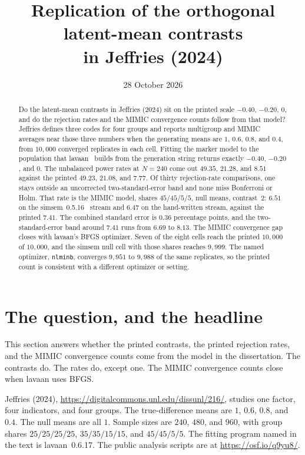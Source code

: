 \documentclass[11pt]{article}
\title{Replication of the orthogonal latent-mean contrasts\\
in Jeffries (2024)}
\author{}
\date{28 October 2026}
\begin{document}
\maketitle

\begin{abstract}
Do the latent-mean contrasts in Jeffries (2024) sit on the printed scale
\(-0.40\), \(-0.20\), \(0\), and do the rejection rates and the MIMIC
convergence counts follow from that model? Jeffries defines three codes
for four groups and reports multigroup and MIMIC averages near those
three numbers when the generating means are \(1\), \(0.6\), \(0.8\), and
\(0.4\), from \(10{,}000\) converged replicates in each cell.
Fitting the marker model to the population that lavaan~\cite{rosseel2012}
builds from the generation string returns exactly \(-0.40\), \(-0.20\),
and \(0\).
The unbalanced power rates at \(N=240\) come out \(49.35\), \(21.28\),
and \(8.51\) against the printed \(49.23\), \(21.08\), and \(7.77\).
Of thirty rejection-rate comparisons, one stays outside an uncorrected
two-standard-error band and none miss Bonferroni or Holm.
That rate is the MIMIC model, shares \(45/45/5/5\), null means,
contrast~2: \(6.51\) on the simsem~0.5.16~\cite{simsem} stream and
\(6.47\) on the hand-written stream, against the printed \(7.41\).
The combined standard error is \(0.36\) percentage points, and the
two-standard-error band around \(7.41\) runs from \(6.69\) to \(8.13\).
The MIMIC convergence gap closes with lavaan's BFGS optimizer.
Seven of the eight cells reach the printed \(10{,}000\) of \(10{,}000\),
and the simsem null cell with those shares reaches \(9{,}999\).
The named optimizer, \texttt{nlminb}, converges \(9{,}951\) to
\(9{,}988\) of the same replicates, so the printed count is consistent
with a different optimizer or setting.
\end{abstract}

\section{The question, and the headline}
\label{sec:headline}

This section answers whether the printed contrasts, the printed
rejection rates, and the MIMIC convergence counts come from the model
in the dissertation.
The contrasts do. The rates do, except one. The MIMIC convergence
counts close when lavaan uses BFGS.

Jeffries (2024), \url{https://digitalcommons.unl.edu/dissunl/216/},
studies one factor, four indicators, and four groups. The
true-difference means are \(1\), \(0.6\), \(0.8\), and \(0.4\). The null
means are all \(1\). Sample sizes are \(240\), \(480\), and \(960\), with
group shares \(25/25/25/25\), \(35/35/15/15\), and \(45/45/5/5\).
The fitting program named in the text is lavaan~0.6.17. The public
analysis scripts are at \url{https://osf.io/q9yu8/}.
\end{document}
